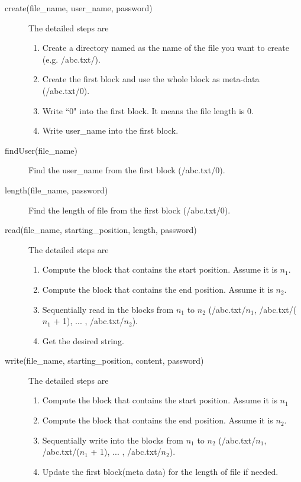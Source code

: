 \documentclass[11pt]{article}
\begin{document}
\begin{description}
 \item[create(file\_name, user\_name, password)] The detailed steps are

    \begin{enumerate}
        \item Create a directory named as the name of the file you want to create (e.g. /abc.txt/).
        \item Create the first block and use the whole block as meta-data (/abc.txt/0).
        \item Write ``0" into the first block. It means the file length is 0.
        \item Write user\_name into the first block.
    \end{enumerate}

 \item[findUser(file\_name)]
    Find the user\_name from the first block (/abc.txt/0).

 \item[length(file\_name, password)]
    Find the length of file from the first block (/abc.txt/0).

 \item[read(file\_name, starting\_position, length, password)]
    The detailed steps are

    \begin{enumerate}
        \item Compute the block that contains the start position. Assume it is $n_1$.
        \item Compute the block that contains the end position. Assume it is $n_2$.
        \item Sequentially read in the blocks from $n_1$ to $n_2$ (/abc.txt/$n_1$, /abc.txt/($n_1$ + 1), ... , /abc.txt/$n_2$).
        \item Get the desired string.
    \end{enumerate}


 \item[write(file\_name, starting\_position, content, password)]
    The detailed steps are

    \begin{enumerate}
        \item Compute the block that contains the start position. Assume it is $n_1$
        \item Compute the block that contains the end position. Assume it is $n_2$.
        \item Sequentially write into the blocks from $n_1$ to $n_2$ (/abc.txt/$n_1$, /abc.txt/($n_1$ + 1), ... , /abc.txt/$n_2$).
        \item Update the first block(meta data) for the length of file if needed.
    \end{enumerate}


\end{description}
\end{document}
